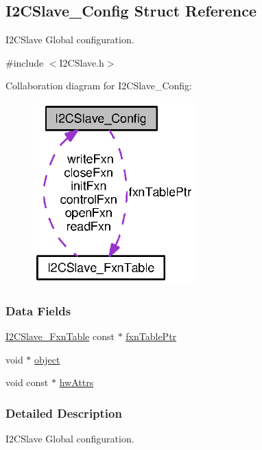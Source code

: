 \subsection{I2\+C\+Slave\+\_\+\+Config Struct Reference}
\label{struct_i2_c_slave___config}


I2\+C\+Slave Global configuration.  




{\ttfamily \#include $<$I2\+C\+Slave.\+h$>$}



Collaboration diagram for I2\+C\+Slave\+\_\+\+Config\+:
\nopagebreak
\begin{figure}[H]
\begin{center}
\leavevmode
\includegraphics[width=177pt]{struct_i2_c_slave___config__coll__graph}
\end{center}
\end{figure}
\subsubsection*{Data Fields}
\begin{DoxyCompactItemize}
\item 
\hyperlink{struct_i2_c_slave___fxn_table}{I2\+C\+Slave\+\_\+\+Fxn\+Table} const $\ast$ \hyperlink{struct_i2_c_slave___config_aa62c3bfdc643859d8ab88853a91ba4b5}{fxn\+Table\+Ptr}
\item 
void $\ast$ \hyperlink{struct_i2_c_slave___config_af79eb80d326365396c1f61e94fa3accf}{object}
\item 
void const $\ast$ \hyperlink{struct_i2_c_slave___config_a436198a1c0b643e5517ea05739bd8bcd}{hw\+Attrs}
\end{DoxyCompactItemize}


\subsubsection{Detailed Description}
I2\+C\+Slave Global configuration. 

